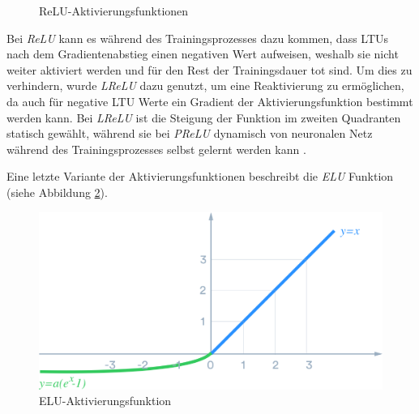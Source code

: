 \begin{figure}[H]
	\caption[ReLU-Aktivierungsfunktionen]{ReLU-Aktivierungsfunktionen \cite{DanqingLiu.20171130}} 
	\label{relu}
\end{figure} 

\newpage

Bei \textit{ReLU} kann es während des Trainingsprozesses dazu kommen, dass LTUs nach dem Gradientenabstieg einen negativen Wert aufweisen, weshalb sie nicht weiter aktiviert werden und für den Rest der Trainingsdauer \glqq tot\grqq{} sind. Um dies zu verhindern, wurde \textit{LReLU} dazu genutzt, um eine Reaktivierung zu ermöglichen, da auch für negative LTU Werte ein Gradient der Aktivierungsfunktion bestimmt werden kann. Bei \textit{LReLU} ist die Steigung der Funktion im zweiten Quadranten statisch gewählt, während sie bei \textit{PReLU} dynamisch von neuronalen Netz während des Trainingsprozesses selbst gelernt werden kann \cite{AurelienGeron.2018}.

Eine letzte Variante der Aktivierungsfunktionen beschreibt die \textit{ELU} Funktion (siehe Abbildung \ref{elu}).

\begin{figure}[H]
	\begin{center}
		\includegraphics[width=12cm]{Bilder/elu.png} 
		\caption[ELU-Aktivierungsfunktion]{ELU-Aktivierungsfunktion \cite{DanqingLiu.20171130}}
		\label{elu}
	\end{center}
\end{figure}

